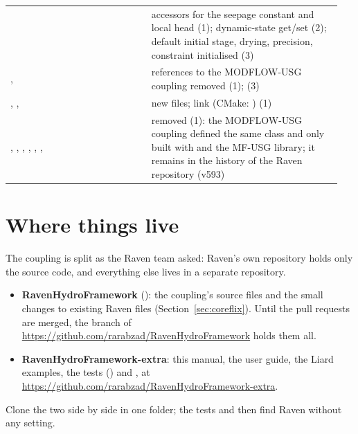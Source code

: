 \begin{table}[!htbp]
\begin{tabular}{P{0.4\linewidth}P{0.548\linewidth}}
 & accessors for the seepage constant and local head (1); dynamic-state get/set (2); default initial stage, drying,  precision, constraint initialised (3)\\
,  & references to the MODFLOW-USG coupling removed (1);  (3)\\
, ,  & new files; link  (CMake: ) (1)\\
, , , , , ,  & removed (1): the MODFLOW-USG coupling defined the same  class and only built with  and the MF-USG library; it remains in the history of the Raven repository (v593)\\\bottomrule
\end{tabular}
\end{table}

\section{Where things live}
The coupling is split as the Raven team asked: Raven's own repository holds only the source code, and everything else
lives in a separate repository.
\begin{itemize}
\item \textbf{RavenHydroFramework} (): the coupling's source files and the small changes to existing Raven files
      (Section~\ref{sec:coreflix}). Until the pull requests are merged, the branch  of
      \url{https://github.com/rarabzad/RavenHydroFramework} holds them all.
\item \textbf{RavenHydroFramework-extra}: this manual, the user guide, the Liard examples, the tests
      () and , at\\ \url{https://github.com/rarabzad/RavenHydroFramework-extra}.
\end{itemize}
Clone the two side by side in one folder; the tests and  then find Raven without any setting.

